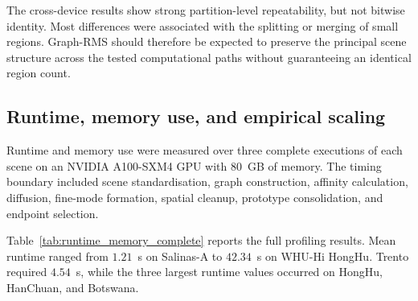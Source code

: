 \documentclass[10pt,a4paper,fleqn]{article}
\begin{document}
The cross-device results show strong partition-level repeatability, but not
bitwise identity. Most differences were associated with the splitting or
merging of small regions. Graph-RMS should therefore be expected to preserve
the principal scene structure across the tested computational paths without
guaranteeing an identical region count.


\subsection{Runtime, memory use, and empirical scaling}
\label{subsec:runtime_results}

Runtime and memory use were measured over three complete executions of each
scene on an NVIDIA A100-SXM4 GPU with 80~GB of memory. The timing boundary
included scene standardisation, graph construction, affinity calculation,
diffusion, fine-mode formation, spatial cleanup, prototype consolidation, and
endpoint selection.

Table~\ref{tab:runtime_memory_complete} reports the full profiling results.
Mean runtime ranged from \(1.21\)~s on Salinas-A to \(42.34\)~s on
WHU-Hi HongHu. Trento required \(4.54\)~s, while the three largest runtime
values occurred on HongHu, HanChuan, and Botswana.
\end{document}
